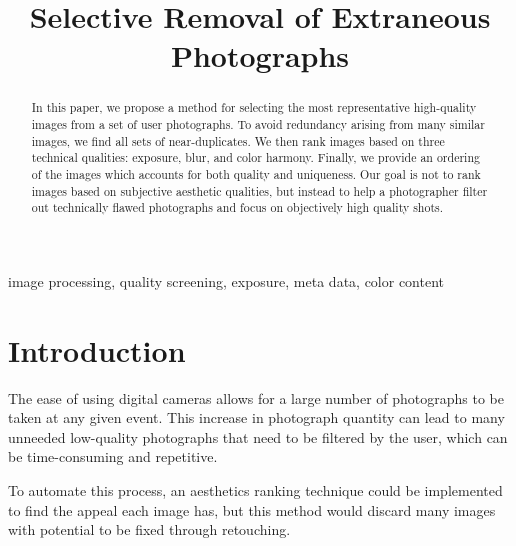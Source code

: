 \documentclass{article}
\begin{document}
\sloppy
\topmargin=0mm			


\title{
Selective Removal of Extraneous Photographs
}

\address{[ksamii,acarlisl]@ucsc.edu,[uliana,davis]@soe.ucsc.edu}

\maketitle	
\begin{abstract}
In this paper, we propose a method for selecting the most representative high-quality images from a set of user photographs. To avoid redundancy arising from many similar images, we find all sets of near-duplicates. We then rank images based on three technical qualities: exposure, blur, and color harmony. Finally, we provide an ordering of the images which accounts for both quality and uniqueness. Our goal is not to rank images based on subjective aesthetic qualities, but instead to help a photographer filter out technically flawed photographs and focus on objectively high quality shots.
\end{abstract}	

\begin{keywords}
image processing, quality screening, exposure, meta data, color content  %
\end{keywords}

\section{Introduction}
\label{sec:intro}

The ease of using digital cameras allows for a large number of photographs to be taken at any given event. This increase in photograph quantity can lead to many unneeded low-quality photographs that need to be filtered by the user, which can be time-consuming and repetitive.

To automate this process, an aesthetics ranking technique could be implemented to find the appeal each image has, but this method would discard many images with potential to be fixed through retouching.
\end{document}
